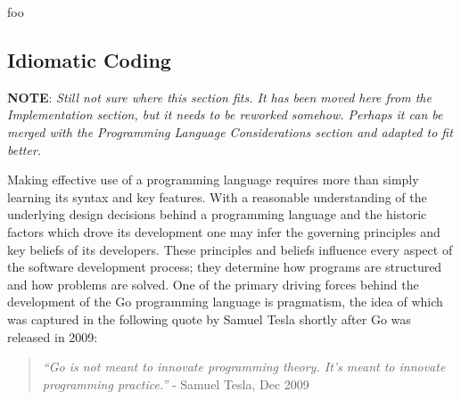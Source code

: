 


foo


\subsection{Idiomatic Coding}


\textbf{NOTE}: \textit{Still not sure where this section fits. It has been moved here from the Implementation section, but it needs to be reworked somehow. Perhaps it can be merged with the Programming Language Considerations section and adapted to fit better.}

Making effective use of a programming language requires more than simply learning its syntax and key features. With a reasonable understanding of the underlying design decisions behind a programming language and the historic factors which drove its development one may infer the governing principles and key beliefs of its developers. These principles and beliefs influence every aspect of the software development process; they determine how programs are structured and how problems are solved. One of the primary driving forces behind the development of the Go programming language is pragmatism, the idea of which was captured in the following quote by Samuel Tesla shortly after Go was released in 2009:

\begin{quote}
	\textit{``Go is not meant to innovate programming theory. It's meant to innovate programming practice.''} - Samuel Tesla, Dec 2009 \cite{pragmatic}
\end{quote}

